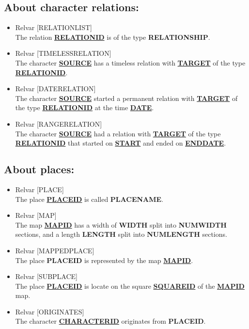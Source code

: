 \documentclass[a4paper ,12pt,french]{article}
\begin{document}
\subsection*{About character relations:}
\begin{itemize}
\item Relvar [RELATIONLIST] \\   The relation \underline{\textbf{RELATIONID}} is of the type \textbf{RELATIONSHIP}.
\item Relvar [TIMELESSRELATION] \\   The character \underline{\textbf{SOURCE}} has a timeless relation with \underline{\textbf{TARGET}} of the type \underline{\textbf{RELATIONID}}.
\item Relvar [DATERELATION] \\  The character \underline{\textbf{SOURCE}} started a permanent relation with \underline{\textbf{TARGET}} of the type \underline{\textbf{RELATIONID}} at the time \underline{\textbf{DATE}}.
\item Relvar [RANGERELATION] \\   The character \underline{\textbf{SOURCE}} had a relation with \underline{\textbf{TARGET}} of the type \underline{\textbf{RELATIONID}} that started on \underline{\textbf{START}} and ended on \underline{\textbf{ENDDATE}}.
\end{itemize}

\subsection*{About places:}
\begin{itemize}
\item Relvar [PLACE] \\   The place \underline{\textbf{PLACEID}} is called \textbf{PLACENAME}.
\item Relvar [MAP] \\  The map \underline{\textbf{MAPID}} has a width of \textbf{WIDTH} split into \textbf{NUMWIDTH} sections, and a length \textbf{LENGTH} split into \textbf{NUMLENGTH} sections.
\item Relvar [MAPPEDPLACE] \\   The place \textbf{PLACEID} is represented by the map \underline{\textbf{MAPID}}.
\item Relvar [SUBPLACE] \\   The place \underline{\textbf{PLACEID}} is locate on the square \underline{\textbf{SQUAREID}} of the \underline{\textbf{MAPID}} map.
\item Relvar [ORIGINATES] \\   The character \underline{\textbf{CHARACTERID}} originates from \textbf{PLACEID}.
\end{itemize}
\end{document}

